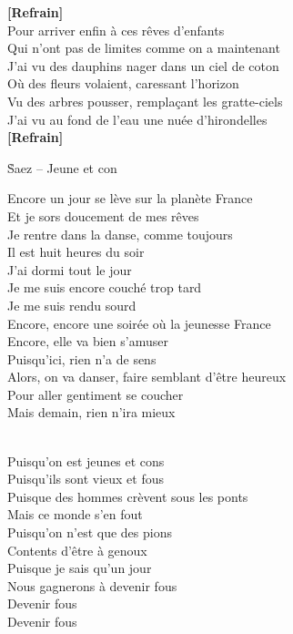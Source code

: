 \documentclass{novel}
\begin{document}
\begin{multicols}{2}
\textbf{[Refrain]}\\

Pour arriver enfin à ces rêves d'enfants \\
Qui n'ont pas de limites comme on a maintenant \\
J'ai vu des dauphins nager dans un ciel de coton \\
Où des fleurs volaient, caressant l'horizon \\
Vu des arbres pousser, remplaçant les gratte-ciels \\
J'ai vu au fond de l'eau une nuée d'hirondelles \\

\textbf{[Refrain]}
\end{multicols}


\newpage
\small
\h*{Saez – Jeune et con}
\begin{multicols}{2}
Encore un jour se lève sur la planète France \\
Et je sors doucement de mes rêves \\
Je rentre dans la danse, comme toujours \\
Il est huit heures du soir \\
J'ai dormi tout le jour \\
Je me suis encore couché trop tard \\
Je me suis rendu sourd \\

Encore, encore une soirée où la jeunesse France \\
Encore, elle va bien s'amuser \\
Puisqu'ici, rien n'a de sens \\
Alors, on va danser, faire semblant d'être heureux \\
Pour aller gentiment se coucher \\
Mais demain, rien n'ira mieux \\

\begin{bfseries}
[Refrain:]\\
Puisqu'on est jeunes et cons \\
Puisqu'ils sont vieux et fous \\
Puisque des hommes crèvent sous les ponts \\
Mais ce monde s'en fout \\
Puisqu'on n'est que des pions \\
Contents d'être à genoux \\
Puisque je sais qu'un jour \\
Nous gagnerons à devenir fous \\
Devenir fous \\
Devenir fous \\
\end{bfseries}


\end{multicols}
\end{document}
